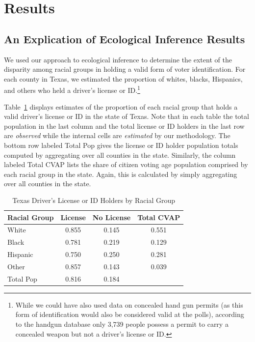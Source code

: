\documentclass[12pt]{article}
\begin{document}
\section{Results}\label{s:res}

\subsection{An Explication of Ecological Inference Results}

We used our approach to ecological inference to determine the extent
of the disparity among racial groups in holding a valid form of voter
identification. For each county in Texas, we estimated the proportion
of whites, blacks, Hispanics, and others who held a driver's
license or ID.\footnote{While we could have also used data on concealed hand
  gun permits (as this form of identification would also be considered
  valid at the polls), according to the handgun database only 3,739 people possess a permit to
  carry a concealed weapon but not a driver's license or ID.}

Table~\ref{cvap_f3_ex} displays estimates of the proportion of each
racial group that holds a valid driver's license or ID in the state of
Texas. Note that in each table the total population in the last column
and the total license or ID holders in the last row are {\it observed} while
the internal cells are {\it estimated} by our methodology. The bottom
row labeled Total Pop gives the license or ID holder population totals
computed by aggregating over all counties in the state.  Similarly,
the column labeled Total CVAP lists the share of citizen voting age
population comprised by each racial group in the state.  Again, this
is calculated by simply aggregating over all counties in the state.

\begin{table}[ht]
\begin{center}
\caption{\label{cvap_f3_ex}Texas Driver's License or ID Holders by Racial Group}
\begin{tabular}{lccc}
  \hline
Racial Group & License & No License & Total CVAP\\
  \hline
White & 0.855 & 0.145 & 0.551 \\ 
Black & 0.781 & 0.219 & 0.129 \\ 
Hispanic & 0.750 & 0.250 & 0.281 \\ 
Other & 0.857 & 0.143 & 0.039 \\ 
Total Pop & 0.816 & 0.184 &   \\ 
   \hline

\end{tabular}
\end{center}
\end{table}
\end{document}
